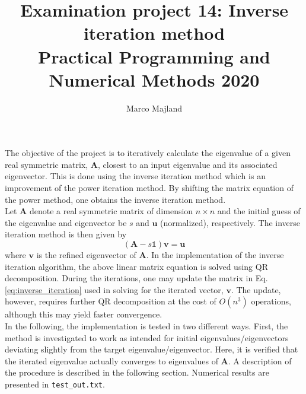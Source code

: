 \documentclass{article}
\title{Examination project 14: Inverse iteration method\\ \small Practical Programming and Numerical Methods 2020}
\author{Marco Majland}
\begin{document}
	\maketitle
	\noindent
	The objective of the project is to iteratively calculate the eigenvalue of a given real symmetric matrix, $\mathbf{A}$, closest to an input eigenvalue and its associated eigenvector. This is done using the inverse iteration method which is an improvement of the power iteration method. By shifting the matrix equation of the power method, one obtains the inverse iteration method.\\
	Let $\mathbf{A}$ denote a real  symmetric matrix of dimension $n\times n$ and the initial guess of the eigenvalue and eigenvector be $s$ and $\mathbf{u}$ (normalized), respectively. The inverse iteration method is then given by
	\begin{equation}
		(\mathbf{A} - s\mathbb{1})\mathbf{v} = \mathbf{u}
		\label{eq:inverse_iteration}
	\end{equation}
	where $\mathbf{v}$ is the refined eigenvector of $\mathbf{A}$. In the implementation of the inverse iteration algorithm, the above linear matrix equation is solved using QR decomposition. During the iterations, one may update the matrix in Eq. \ref{eq:inverse_iteration} used in solving for the iterated vector, $\mathbf{v}$. The update, however, requires further QR decomposition at the cost of $O(n^3)$ operations, although this may yield faster convergence.\\
	In the following, the implementation is tested in two different ways. First, the method is investigated to work as intended for initial eigenvalues/eigenvectors deviating slightly from the target eigenvalue/eigenvector. Here, it is verified that the iterated eigenvalue actually converges to eigenvalues of $\mathbf{A}$. A description of the procedure is described in the following section. Numerical results are presented in \texttt{test\_out.txt}.
\end{document}
